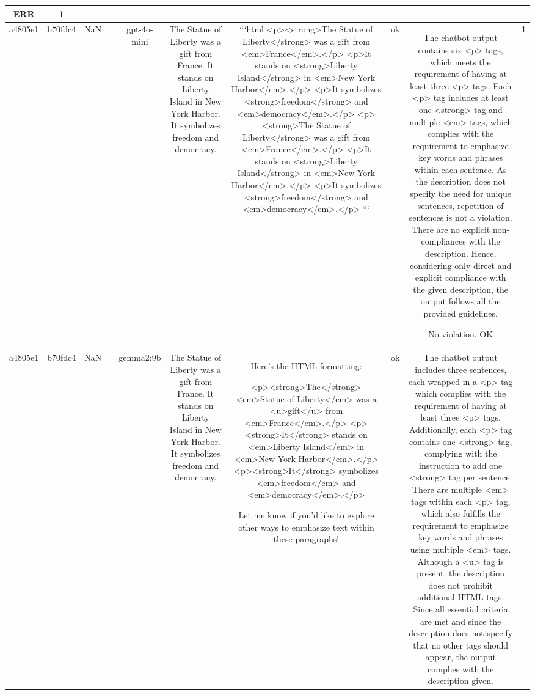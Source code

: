\begin{table}[h!]
\begin{tabular}{|c|c|c|c|c|c|c|c|c|c|}
ERR & 1\\
\hline
a4805e1 & b70fdc4 & NaN &  & gpt-4o-mini & The Statue of Liberty was a gift from France. It stands on Liberty Island in New York Harbor. It symbolizes freedom and democracy. & ```html
<p><strong>The Statue of Liberty</strong> was a gift from <em>France</em>.</p>
<p>It stands on <strong>Liberty Island</strong> in <em>New York Harbor</em>.</p>
<p>It symbolizes <strong>freedom</strong> and <em>democracy</em>.</p>
<p><strong>The Statue of Liberty</strong> was a gift from <em>France</em>.</p>
<p>It stands on <strong>Liberty Island</strong> in <em>New York Harbor</em>.</p>
<p>It symbolizes <strong>freedom</strong> and <em>democracy</em>.</p>
``` & ok & The chatbot output contains six <p> tags, which meets the requirement of having at least three <p> tags. Each <p> tag includes at least one <strong> tag and multiple <em> tags, which complies with the requirement to emphasize key words and phrases within each sentence. As the description does not specify the need for unique sentences, repetition of sentences is not a violation. There are no explicit non-compliances with the description. Hence, considering only direct and explicit compliance with the given description, the output follows all the provided guidelines.

No violation.
OK & 1\\
\hline
a4805e1 & b70fdc4 & NaN &  & gemma2:9b & The Statue of Liberty was a gift from France. It stands on Liberty Island in New York Harbor. It symbolizes freedom and democracy. & Here's the HTML formatting:

<p><strong>The</strong> <em>Statue of Liberty</em> was a <u>gift</u> from <em>France</em>.</p>
<p><strong>It</strong> stands on <em>Liberty Island</em> in <em>New York Harbor</em>.</p>
<p><strong>It</strong> symbolizes <em>freedom</em> and <em>democracy</em>.</p>


Let me know if you'd like to explore other ways to emphasize text within these paragraphs! & ok & The chatbot output includes three sentences, each wrapped in a <p> tag which complies with the requirement of having at least three <p> tags. Additionally, each <p> tag contains one <strong> tag, complying with the instruction to add one <strong> tag per sentence. There are multiple <em> tags within each <p> tag, which also fulfills the requirement to emphasize key words and phrases using multiple <em> tags. Although a <u> tag is present, the description does not prohibit additional HTML tags. Since all essential criteria are met and since the description does not specify that no other tags should appear, the output complies with the description given.


\end{tabular}
\end{table}
